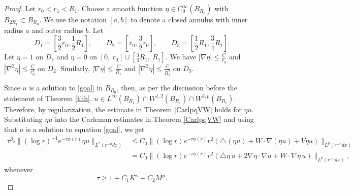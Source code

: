 \documentclass[11pt]{amsart}
\theoremstyle{plain}
\numberwithin{equation}{section}
\begin{document}
\begin{proof}
Let $r_0< r_1< R_1$.
Choose a smooth function $\eta\in C^\infty_{0}(B_{R_0})$ with $B_{2R_1}\subset B_{R_0}$.
We use the notation ${\left[{a,b}\right]}$ to denote a closed annulus with inner radius $a$ and outer radius $b$.
Let
$$D_1={\left[{\frac{3}{2}r_0, \frac{1}{2}R_1 }\right]}, \quad  \quad
D_2= {\left[{r_0, \frac{3}{2}r_0}\right]}, \quad \quad
D_3={\left[{\frac{1}{2}R_1, \frac{3 }{4}R_1}\right]}.$$ Let $\eta=1$ on $D_1$
and $\eta=0$ on $[0, \ r_0]\cup {\left[{\frac{3}{4}R_1, \ R_1}\right]}$. We
have $|\nabla \eta|\leq \frac{C}{r_0}$ and $|\nabla^2\eta|\leq
\frac{C}{r_0^2}$ on $D_2$. Similarly, $|\nabla \eta|\leq
\frac{C}{R_1}$ and $|\nabla^2 \eta|\leq\frac{C}{R_1^2}$ on $D_3$.

Since $u$ is a solution to \eqref{goal} in $B_{R_0}$, then, as per the discussion before the statement of Theorem \ref{thh}, $u \in L^{\infty}{\left( {B_{R_1}} \right) } \cap W^{1,2}{\left( {B_{R_1}} \right) } \cap W^{2,p}{\left( {B_{R_1}} \right) }$.
Therefore, by regularization, the estimate in Theorem \ref{CarlpqVW} holds for $\eta u$.
Substituting $\eta u$ into the Carleman estimates in Theorem \ref{CarlpqVW} and using that $u$ is a solution to equation \eqref{goal}, we get
\begin{align*}
\tau^{{\beta}_0} \|(\log r)^{-1} e^{-\tau \phi(r)} \eta u\|_{L^2(r^{-n}dx)}
&\leq  C_0 \|(\log r ) e^{-\tau \phi(r)} r^2{\left( { \triangle {\left( {\eta u} \right) } + W \cdot {\nabla}{\left( {\eta u} \right) } + V \eta u} \right) }\|_{L^p(r^{-n} dx)} \\
&=  C_0 \|(\log r ) e^{-\tau \phi(r)} r^2{\left( { \triangle \eta \, u + 2 {\nabla} \eta \cdot {\nabla} u + W \cdot {\nabla} \eta \, u } \right) }\|_{L^p(r^{-n} dx)},
\end{align*}
whenever
$$\tau \ge 1+ C_1 K^{\kappa} + C_2 M^{\mu}.$$


\end{proof}
\end{document}
